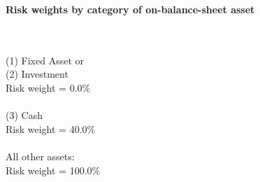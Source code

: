 \documentclass{article}
\begin{document}
\setlength{\parindent}{0em}
\begin{center}{\bf Risk weights by category of on-balance-sheet asset}\end{center}
~\\
~\\

(1) Fixed Asset or \\
(2) Investment\\
Risk weight = 0.0\%\\

~\\
(3) Cash \\
Risk weight = 40.0\%\\

~\\
All other assets:\\
Risk weight = 100.0\%\\

~\\
\end{document}
